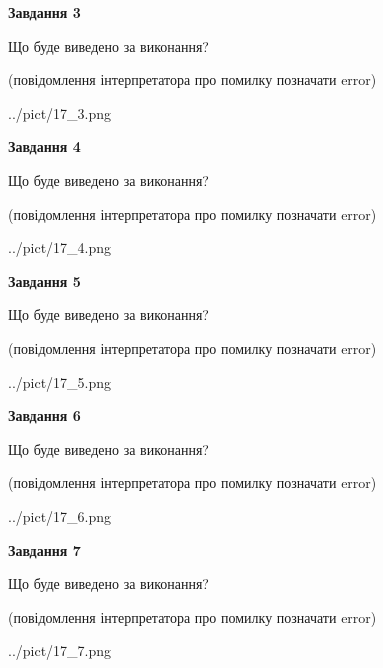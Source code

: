 \documentclass[12pt, ukrainian]{article}
\begin{document}
{\begin {large}
{\begin {center}\textbf{Завдання 3}\end {center}}\par
Що буде виведено за виконання?\par
 (повідомлення інтерпретатора про помилку позначати error)\par
\begin{center}
	{../pict/17_3.png}
\end{center}
\newpage

{\begin {center}\textbf{Завдання 4}\end {center}}\par
Що буде виведено за виконання?\par
 (повідомлення інтерпретатора про помилку позначати error)\par
\begin{center}
	{../pict/17_4.png}
\end{center}
\newpage

{\begin {center}\textbf{Завдання 5}\end {center}}\par
Що буде виведено за виконання?\par
 (повідомлення інтерпретатора про помилку позначати error)\par
\begin{center}
	{../pict/17_5.png}
\end{center}
\newpage

{\begin {center}\textbf{Завдання 6}\end {center}}\par
Що буде виведено за виконання?\par
 (повідомлення інтерпретатора про помилку позначати error)\par
\begin{center}
	{../pict/17_6.png}
\end{center}
\newpage

{\begin {center}\textbf{Завдання 7}\end {center}}\par
Що буде виведено за виконання?\par
 (повідомлення інтерпретатора про помилку позначати error)\par
\begin{center}
	{../pict/17_7.png}
\end{center}
\newpage


\end{large}}
\end{document}
